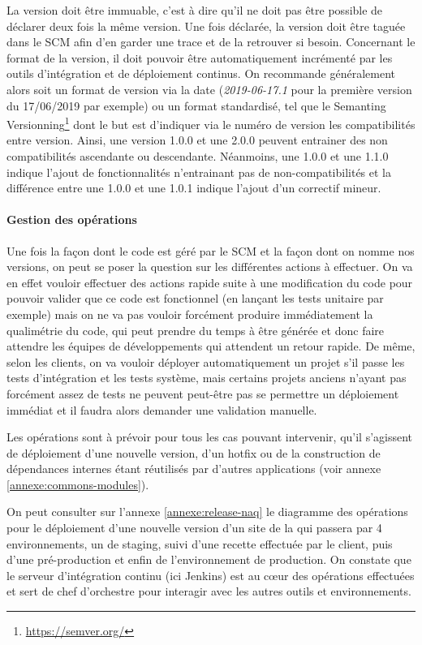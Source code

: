 La version doit être immuable, c'est à dire qu'il ne doit pas être possible de déclarer deux fois la même version. Une fois déclarée, la version doit être taguée dans le \gls{SCM} afin d'en garder une trace et de la retrouver si besoin. Concernant le format de la version, il doit pouvoir être automatiquement incrémenté par les outils d'intégration et de déploiement continus. On recommande généralement alors soit un format de version via la date (\emph{2019-06-17.1} pour la première version du 17/06/2019 par exemple) ou un format standardisé, tel que le Semanting Versionning\footnote{\url{https://semver.org/}} dont le but est d'indiquer via le numéro de version les compatibilités entre version. Ainsi, une version 1.0.0 et une 2.0.0 peuvent entrainer des non compatibilités ascendante ou descendante. Néanmoins, une 1.0.0 et une 1.1.0 indique l'ajout de fonctionnalités n'entrainant pas de non-compatibilités et la différence entre une 1.0.0 et une 1.0.1 indique l'ajout d'un correctif mineur.

\paragraph{Gestion des opérations}

Une fois la façon dont le code est géré par le \gls{SCM} et la façon dont on nomme nos versions, on peut se poser la question sur les différentes actions à effectuer. On va en effet vouloir effectuer des actions rapide suite à une modification du code pour pouvoir valider que ce code est fonctionnel (en lançant les tests unitaire par exemple) mais on ne va pas vouloir forcément produire immédiatement la qualimétrie du code, qui peut prendre du temps à être générée et donc faire attendre les équipes de développements qui attendent un retour rapide. De même, selon les clients, on va vouloir déployer automatiquement un projet s'il passe les tests d'intégration et les tests système, mais certains projets anciens n'ayant pas forcément assez de tests ne peuvent peut-être pas se permettre un déploiement immédiat et il faudra alors demander une validation manuelle.

Les opérations sont à prévoir pour tous les cas pouvant intervenir, qu'il s'agissent de déploiement d'une nouvelle version, d'un \gls{hotfix} ou de la construction de dépendances internes étant réutilisés par d'autres applications (voir annexe \ref{annexe:commons-modules}).

On peut consulter sur l'annexe \ref{annexe:release-naq} le diagramme des opérations pour le déploiement d'une nouvelle version d'un site de la \naq qui passera par 4 environnements, un de staging, suivi d'une recette effectuée par le client, puis d'une pré-production et enfin de l'environnement de production. On constate que le serveur d'intégration continu (ici Jenkins) est au cœur des opérations effectuées et sert de chef d'orchestre pour interagir avec les autres outils et environnements. 

